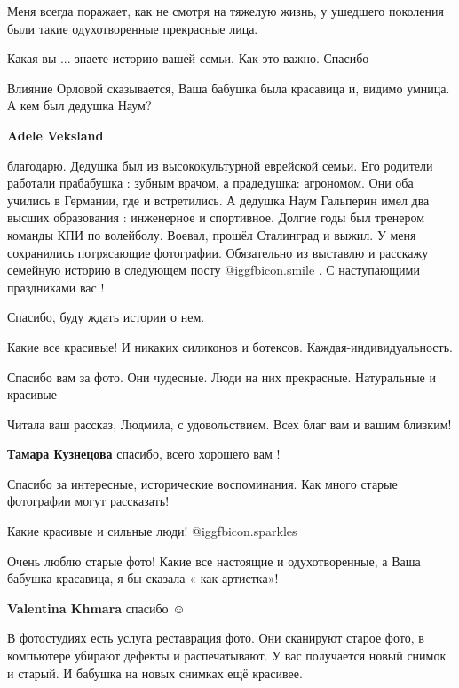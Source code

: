 \begin{itemize}
Меня всегда поражает, как не смотря на тяжелую жизнь, у ушедшего поколения были
такие одухотворенные прекрасные лица.

Какая вы ... знаете историю вашей семьи. Как это важно. Спасибо

Влияние Орловой сказывается, Ваша бабушка была красавица и, видимо умница. А
кем был дедушка Наум?

\begin{itemize} %
\textbf{Adele Veksland} 

благодарю. Дедушка был из высококультурной еврейской семьи. Его родители
работали прабабушка : зубным врачом, а прадедушка: агрономом. Они оба учились в
Германии, где и встретились. А дедушка Наум Гальперин имел два высших
образования : инженерное и спортивное. Долгие годы был тренером команды КПИ по
волейболу. Воевал, прошёл Сталинград и выжил. У меня сохранились потрясающие
фотографии. Обязательно из выставлю и расскажу семейную историю в следующем
посту @igg{fbicon.smile} . С наступающими праздниками вас !


Спасибо, буду ждать истории о нем.
\end{itemize} %

Какие все красивые! И никаких силиконов и ботексов. Каждая-индивидуальность.

Спасибо вам за фото. Они чудесные. Люди на них прекрасные. Натуральные и красивые

Читала ваш рассказ, Людмила, с удовольствием. Всех благ вам и вашим близким!

\textbf{Тамара Кузнецова} спасибо, всего хорошего вам !

Спасибо за интересные, исторические воспоминания. Как много старые фотографии могут рассказать!

Какие красивые и сильные люди!  @igg{fbicon.sparkles} 

Очень люблю старые фото! Какие все настоящие и одухотворенные, а Ваша бабушка
красавица, я бы сказала « как артистка»!

\textbf{Valentina Khmara} спасибо  ☺ ️ 


В фотостудиях есть услуга реставрация фото. Они сканируют старое фото, в
компьютере убирают дефекты и распечатывают. У вас получается новый снимок и
старый. И бабушка на новых снимках ещё красивее.



\end{itemize}
